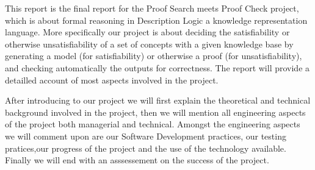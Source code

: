 This report is the final report for the Proof Search meets Proof Check
project, which is about formal reasoning in Description Logic a
knowledge representation language.  More specifically our project is
about deciding the satisfiability or otherwise unsatisfiability of a
set of concepts with a given knowledge base by generating a model (for
satisfiability) or otherwise a proof (for unsatisfiability), and
checking automatically the outputs for correctness. The report will
provide a detailled account of most aspects involved in the project.

After introducing to our project we will first explain the theoretical
and technical background involved in the project, then we will mention
all engineering aspects of the project both managerial and
technical. Amongst the engineering aspects we will comment upon are
our Software Development practices, our testing pratices,our progress
of the project and the use of the technology available. Finally we
will end with an asssessement on the success of the project.
